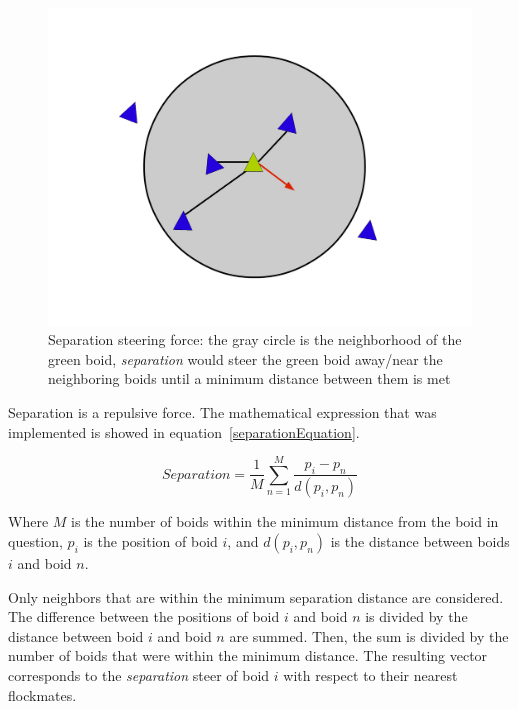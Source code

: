 \begin{figure}[htbp]
\begin{center}
\includegraphics[scale=0.3]{figures/separation.pdf}
\caption{Separation steering force: the gray circle is the neighborhood of the green boid, \textit{separation} would steer the green boid away/near the neighboring boids until a minimum distance between them is met}
\label{separationPDF}
\end{center}
\end{figure}

Separation is a repulsive force. The mathematical expression that was implemented is showed in equation~\ref{separationEquation}.

\begin{equation}
\label{separationEquation}
Separation =\frac{1}{M} \sum_{n=1}^{M} \frac{p_i - p_n}{d(p_i,p_n)}
\end{equation}

Where $M$ is the number of boids within the minimum distance from the boid in question, $p_i$ is the position of boid $i$, and $d(p_i,p_n)$ is the distance between boids $i$ and boid $n$.

Only neighbors that are within the minimum separation distance are considered. The difference between the positions of boid $i$ and boid $n$ is divided by the distance between boid $i$ and boid $n$ are summed. Then, the sum is divided by the number of boids that were within the minimum distance. The resulting vector corresponds to the \textit{separation} steer of boid $i$ with respect to their nearest flockmates. 


